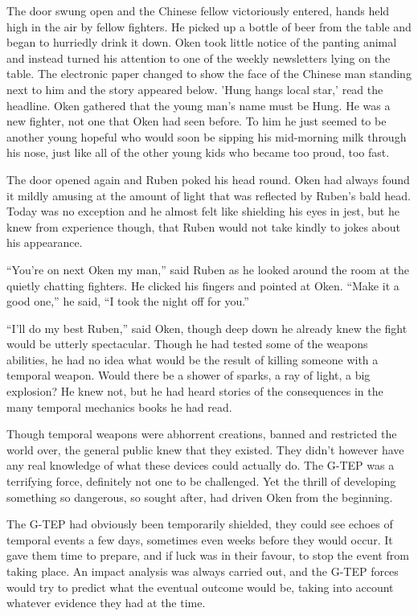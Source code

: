 The door swung open and the Chinese fellow victoriously entered, hands held high in the air by fellow fighters.  He picked up a bottle of beer from the table and began to hurriedly drink it down.  Oken took little notice of the panting animal and instead turned his attention to one of the weekly newsletters lying on the table.  The electronic paper changed to show the face of the Chinese man standing next to him and the story appeared below.  'Hung hangs local star,' read the headline.  Oken gathered that the young man's name must be Hung.  He was a new fighter, not one that Oken had seen before.  To him he just seemed to be another young hopeful who would soon be sipping his mid-morning milk through his nose, just like all of the other young kids who became too proud, too fast.

The door opened again and Ruben poked his head round.  Oken had always found it mildly amusing at the amount of light that was reflected by Ruben's bald head.  Today was no exception and he almost felt like shielding his eyes in jest, but he knew from experience though, that Ruben would not take kindly to jokes about his appearance.

``You're on next Oken my man,'' said Ruben as he looked around the room at the quietly chatting fighters.  He clicked his fingers and pointed at Oken.  ``Make it a good one,'' he said, ``I took the night off for you.''  

``I'll do my best Ruben,'' said Oken, though deep down he already knew the fight would be utterly spectacular.  Though he had tested some of the weapons abilities, he had no idea what would be the result of killing someone with a temporal weapon.  Would there be a shower of sparks, a ray of light, a big explosion?  He knew not, but he had heard stories of the consequences in the many temporal mechanics books he had read.  

Though temporal weapons were abhorrent creations, banned and restricted the world over, the general public knew that they existed.  They didn't however have any real knowledge of what these devices could actually do.  The G-TEP was a terrifying force, definitely not one to be challenged.  Yet the thrill of developing something so dangerous, so sought after, had driven Oken from the beginning.  

The G-TEP had obviously been temporarily shielded, they could see echoes of temporal events a few days, sometimes even weeks before they would occur.  It gave them time to prepare, and if luck was in their favour, to stop the event from taking place.  An impact analysis was always carried out, and the G-TEP forces would try to predict what the eventual outcome would be, taking into account whatever evidence they had at the time.

